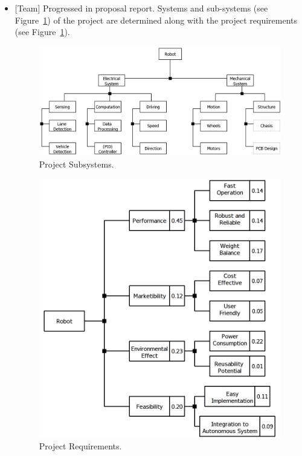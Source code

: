 \documentclass[a4paper,12pt]{article}
\begin{document}
\begin{itemize}
\item {[Team]} Progressed in proposal report. Systems and sub-systems (see {Figure~\ref{fig:product-subsystems}}) of the project are determined along with the project requirements (see {Figure~\ref{fig:product-subsystems}}).
\begin{figure}[h]
	\centering
	\setlength{\unitlength}{\textwidth} 
	\includegraphics[width=\textwidth,height=\textheight,keepaspectratio]{product-subsystems}
	\caption{\label{fig:product-subsystems} Project Subsystems.}
\end{figure} 
\begin{figure}[h!]
	\centering
	\setlength{\unitlength}{\textwidth} 
	\includegraphics[width=\textwidth,height=\textheight,keepaspectratio]{project-systems}
	\caption{\label{fig:project-systems} Project Requirements.}
\end{figure} 



\end{itemize}
\end{document}
